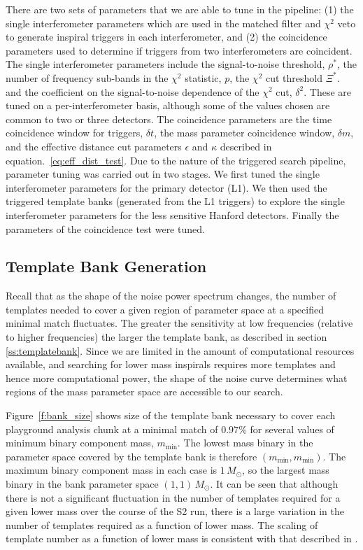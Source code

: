 There are two sets of parameters that we are able to tune in the pipeline: (1)
the single interferometer parameters which are used in the matched filter and
$\chi^2$ veto to generate inspiral triggers in each interferometer, and (2)
the coincidence parameters used to determine if triggers from two
interferometers are coincident. The single interferometer parameters include
the signal-to-noise threshold, $\rho^\ast$, the number of frequency sub-bands
in the $\chi^2$ statistic, $p$, the $\chi^2$ cut threshold $\Xi^\ast$.  and
the coefficient on the signal-to-noise dependence of the $\chi^2$ cut,
$\delta^2$. These are tuned on a per-interferometer basis, although some of
the values chosen are common to two or three detectors.  The coincidence
parameters are the time coincidence window for triggers, $\delta t$, the mass
parameter coincidence window, $\delta m$, and the effective distance cut
parameters $\epsilon$ and $\kappa$ described in
equation.~\ref{eq:eff_dist_test}.  Due to the nature of the triggered search
pipeline, parameter tuning was carried out in two stages. We first tuned the
single interferometer parameters for the primary detector (L1).  We then used
the triggered template banks (generated from the L1 triggers) to explore the
single interferometer parameters for the less sensitive Hanford detectors.
Finally the parameters of the coincidence test were tuned.

\subsection{Template Bank Generation}
\label{ss:tunebank}

Recall that as the shape of the noise power spectrum changes, the number of
templates needed to cover a given region of parameter space at a specified
minimal match fluctuates. The greater the sensitivity at low frequencies
(relative to higher frequencies) the larger the template bank, as described in
section \ref{ss:templatebank}. Since we are limited in the amount of
computational resources available, and searching for lower mass inspirals
requires more templates and hence more computational power, the shape of the
noise curve determines what regions of the mass parameter space are accessible
to our search. 

Figure~\ref{f:bank_size} shows size of the template bank necessary to cover
each playground analysis chunk at a minimal match of $0.97\%$ for several
values of minimum binary component mass, $m_\mathrm{min}$. The lowest mass
binary in the parameter space covered by the template bank is therefore
$(m_\mathrm{min},m_\mathrm{min})$.  The maximum binary component mass in each
case is $1\,M_\odot$, so the largest mass binary in the bank parameter space
$(1,1)\,M_\odot$. It can be seen that although there is not a significant
fluctuation in the number of templates required for a given lower mass over
the course of the S2 run, there is a large variation in the number of
templates required as a function of lower mass. The scaling of template number
as a function of lower mass is consistent with that described in
\cite{Owen:1998dk}.

